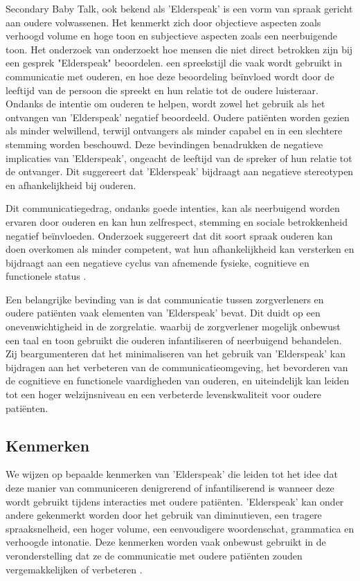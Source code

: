 Secondary Baby Talk, ook bekend als 'Elderspeak' is een vorm van spraak gericht aan oudere volwassenen. Het kenmerkt zich door objectieve aspecten zoals verhoogd volume en hoge toon en subjectieve aspecten zoals een neerbuigende toon. Het onderzoek van \textcite{balsis2006evaluations} onderzoekt hoe mensen die niet direct betrokken zijn bij een gesprek "Elderspeak" beoordelen. een spreekstijl die vaak wordt gebruikt in communicatie met ouderen, en hoe deze beoordeling beïnvloed wordt door de leeftijd van de persoon die spreekt en hun relatie tot de oudere luisteraar. 
Ondanks de intentie om ouderen te helpen, wordt zowel het gebruik als het ontvangen van 'Elderspeak' negatief beoordeeld. Oudere patiënten worden gezien als minder welwillend, terwijl ontvangers als minder capabel en in een slechtere stemming worden beschouwd. Deze bevindingen benadrukken de negatieve implicaties van 'Elderspeak', ongeacht de leeftijd van de spreker of hun relatie tot de ontvanger. Dit suggereert dat 'Elderspeak' bijdraagt aan negatieve stereotypen en afhankelijkheid bij ouderen.

Dit communicatiegedrag, ondanks goede intenties, kan als neerbuigend worden ervaren door ouderen en kan hun zelfrespect, stemming en sociale betrokkenheid negatief beïnvloeden. Onderzoek suggereert dat dit soort spraak ouderen kan doen overkomen als minder competent, wat hun afhankelijkheid kan versterken en bijdraagt aan een negatieve cyclus van afnemende fysieke, cognitieve en functionele status \autocite{balsis2006evaluations}.


Een belangrijke bevinding van \textcite{williams2005enhancing} is dat communicatie tussen zorgverleners en oudere patiënten vaak elementen van 'Elderspeak' bevat. Dit duidt op een onevenwichtigheid in de zorgrelatie. waarbij de zorgverlener mogelijk onbewust een taal en toon gebruikt die ouderen infantiliseren of neerbuigend behandelen.
 Zij beargumenteren dat het minimaliseren van het gebruik van 'Elderspeak' kan bijdragen aan het verbeteren van de communicatieomgeving, het bevorderen van de cognitieve en functionele vaardigheden van ouderen, en uiteindelijk kan leiden tot een hoger welzijnsniveau en een verbeterde levenskwaliteit voor oudere patiënten.
\subsection{Kenmerken}
We wijzen op bepaalde kenmerken van 'Elderspeak' die leiden tot het idee dat deze manier van communiceren denigrerend of infantiliserend is wanneer deze wordt gebruikt tijdens interacties met oudere patiënten. 'Elderspeak' kan onder andere gekenmerkt worden door het gebruik van diminutieven, een tragere spraaksnelheid, een hoger volume, een eenvoudigere woordenschat, grammatica en verhoogde intonatie. Deze kenmerken worden vaak onbewust gebruikt in de veronderstelling dat ze de communicatie met oudere patiënten zouden vergemakkelijken of verbeteren \autocite{williams2005enhancing}.

